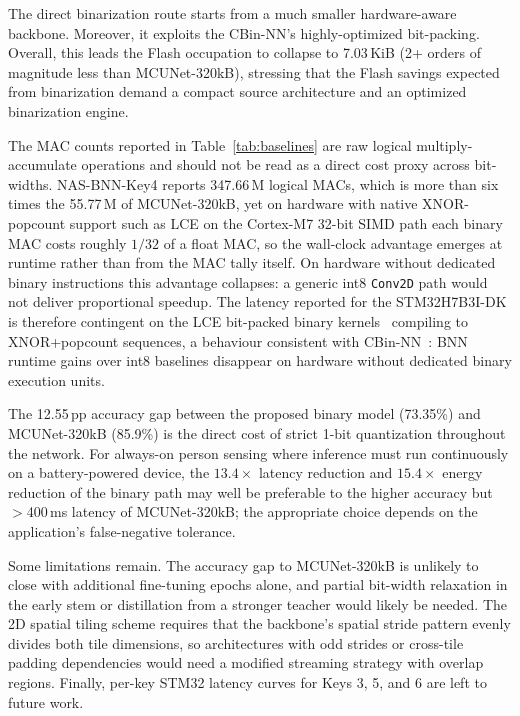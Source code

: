\documentclass[conference]{IEEEtran}
\begin{document}
The direct binarization route starts from a much smaller hardware-aware backbone. Moreover, it exploits the CBin-NN's highly-optimized bit-packing. Overall, this leads the Flash occupation to collapse to 7.03\,KiB (2+ orders of magnitude less than MCUNet-320kB), stressing that the Flash savings expected from binarization demand a compact source architecture and an optimized binarization engine.

The MAC counts reported in Table~\ref{tab:baselines} are raw logical multiply-accumulate operations and should not be read as a direct cost proxy across bit-widths. NAS-BNN-Key4 reports 347.66\,M logical MACs, which is more than six times the 55.77\,M of MCUNet-320kB, yet on hardware with native XNOR-popcount support such as LCE on the Cortex-M7 32-bit SIMD path each binary MAC costs roughly $1/32$ of a float MAC, so the wall-clock advantage emerges at runtime rather than from the MAC tally itself. On hardware without dedicated binary instructions this advantage collapses: a generic int8 \texttt{Conv2D} path would not deliver proportional speedup. The latency reported for the STM32H7B3I-DK is therefore contingent on the LCE bit-packed binary kernels~\cite{bannink2021larq} compiling to XNOR+popcount sequences, a behaviour consistent with CBin-NN~\cite{sakr2024cbinnn}: BNN runtime gains over int8 baselines disappear on hardware without dedicated binary execution units.

The 12.55\,pp accuracy gap between the proposed binary model (73.35\%) and MCUNet-320kB (85.9\%) is the direct cost of strict 1-bit quantization throughout the network. For always-on person sensing where inference must run continuously on a battery-powered device, the $13.4\times$ latency reduction and $15.4\times$ energy reduction of the binary path may well be preferable to the higher accuracy but $>$400\,ms latency of MCUNet-320kB; the appropriate choice depends on the application's false-negative tolerance.

Some limitations remain. The accuracy gap to MCUNet-320kB is unlikely to close with additional fine-tuning epochs alone, and partial bit-width relaxation in the early stem or distillation from a stronger teacher would likely be needed. The 2D spatial tiling scheme requires that the backbone's spatial stride pattern evenly divides both tile dimensions, so architectures with odd strides or cross-tile padding dependencies would need a modified streaming strategy with overlap regions. Finally, per-key STM32 latency curves for Keys 3, 5, and 6 are left to future work.
\end{document}
